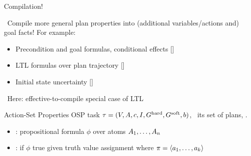 \begin{frame}{Compilation!}

\notesym~Compile more general plan properties into (additional 
variables/actions and) goal facts! For example:

\begin{itemize}
\item Precondition and goal formulas, conditional effects 
{\footnotesize [\cite{gazen:knoblock:ecp-97,nebel:jair-00}]}
\item LTL formulas over plan trajectory {\footnotesize [\cite{edelkamp:icaps-06,baier:etal:ai-09}]}
\item Initial state uncertainty {\footnotesize [\cite{palacios:geffner:jair-09}]}
\end{itemize}

\medskip \pause

%
\notesym~Here: effective-to-compile special case of LTL

\begin{mydef}{Action-Set Properties}
%
OSP task $\tau =
(V,\allowbreak A,\allowbreak{\ensuremath{c}},\allowbreak I,\allowbreak G^{\text{\textup{hard}}},\allowbreak G^{\text{\textup{soft}}},\allowbreak{\ensuremath{b}})$, \plans\
its set of plans, .
\begin{itemize}
\item {}: propositional formula $\phi$ over 
atoms $A_1, \dots, A_n$
\item {}: if $\phi$ true given truth value
assignment \textred{$\acts_i \cap \{a_1, \dots, a_k\} \neq \emptyset$
?  $\acts_i \mapsto \true$ : $\acts_i \mapsto \false$} where $\pi
= \langle a_1, \dots, a_k\rangle$
\end{itemize}
%
%
\end{mydef}

\medskip

\end{frame}


